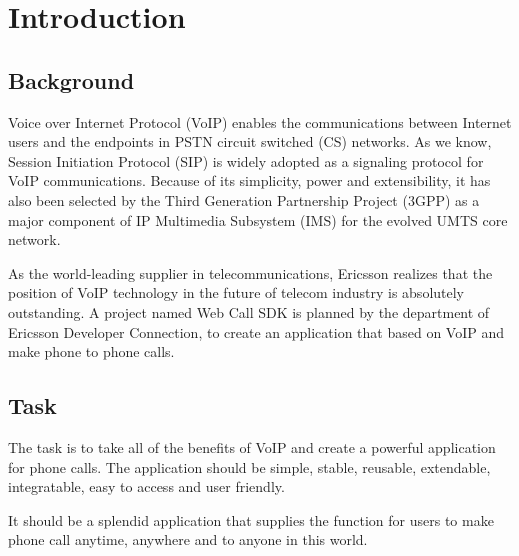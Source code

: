 \chapter{Introduction}
\label{sec:Introduction}


\section{Background}
\label{sec:Introduction:Background}

Voice over Internet Protocol (VoIP)\label{sym:VoIP} enables the communications between Internet users and the endpoints in PSTN circuit switched (CS)\label{sym:CS} networks. As we know, Session Initiation Protocol (SIP) is widely adopted as a signaling protocol for VoIP communications. Because of its simplicity, power and extensibility, it has also been selected by the Third Generation Partnership Project (3GPP)\label{sym:3GPP} as a major component of IP Multimedia Subsystem (IMS)\label{sym:IMS} for the evolved UMTS core network. 

As the world-leading supplier in telecommunications, Ericsson realizes that the position of VoIP technology in the future of telecom industry is absolutely outstanding. A project named Web Call SDK is planned by the department of Ericsson Developer Connection, to create an application that based on VoIP and make phone to phone calls. 

\section{Task}
\label{sec:Introduction:Task}

The task is to take all of the benefits of VoIP and create a powerful application for phone calls. The application should be simple, stable, reusable, extendable, integratable, easy to access and user friendly. 

It should be a splendid application that supplies the function for users to make phone call anytime, anywhere and to anyone in this world.

